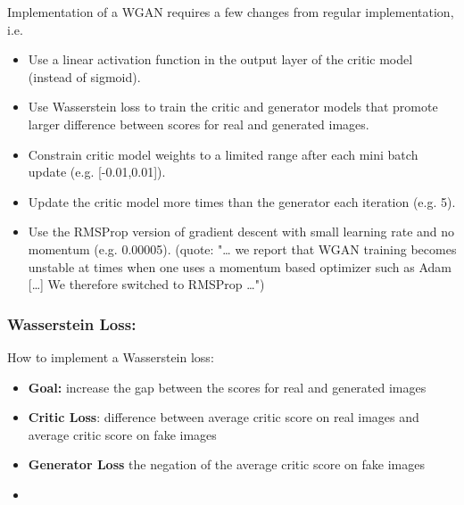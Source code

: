 \documentclass{article}
\begin{document}
Implementation of a WGAN requires a few changes from regular implementation, i.e. 

\begin{itemize}
    \item Use a linear activation function in the output layer of the critic model (instead of sigmoid).
    \item Use Wasserstein loss to train the critic and generator models that promote larger difference between scores for real and generated images.
    \item Constrain critic model weights to a limited range after each mini batch update (e.g. [-0.01,0.01]).
    \item Update the critic model more times than the generator each iteration (e.g. 5).
    \item Use the RMSProp version of gradient descent with small learning rate and no momentum (e.g. 0.00005). (quote: "… we report that WGAN training becomes unstable at times when one uses a momentum based optimizer such as Adam […] We therefore switched to RMSProp …")

\end{itemize}

\subsubsection{Wasserstein Loss:}

How to implement a Wasserstein loss:

\begin{itemize}
    \item \textbf{Goal:} increase the gap between the scores for real and generated images
    \item \textbf{Critic Loss}: difference between average critic score on real images and average critic score on fake images
    \item \textbf{Generator Loss} the negation of the average critic score on fake images
    \item 
\end{itemize}
\end{document}
